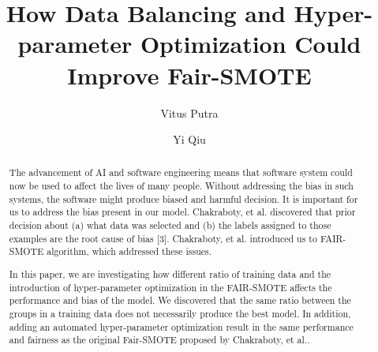 \documentclass[sigconf]{acmart}
\begin{document}
\title{How Data Balancing and Hyper-parameter Optimization Could Improve Fair-SMOTE }

\author{Vitus Putra}

\author{Yi Qiu}

\renewcommand{\shortauthors}{Putra and Qiu}

\begin{abstract}
  The advancement of AI and software engineering means that software system could now be used to affect the lives of many people. Without addressing the bias in such systems, the software might produce biased and harmful decision. It is important for us to address the bias present in our model. Chakraboty, et al. discovered that prior decision about  (a) what data was selected and (b) the labels assigned to those examples  are the root cause of bias [3]. Chakraboty, et al. introduced us to FAIR-SMOTE algorithm, which addressed these issues.
  
  In this paper, we are investigating how different ratio of training data and the introduction of hyper-parameter optimization in the FAIR-SMOTE affects the performance and bias of the model. We discovered that the same ratio between the groups in a training data does not necessarily produce the best model. In addition, adding an automated hyper-parameter optimization result in the same performance and fairness as the original Fair-SMOTE proposed by Chakraboty, et al..  
\end{abstract}

\end{document}
